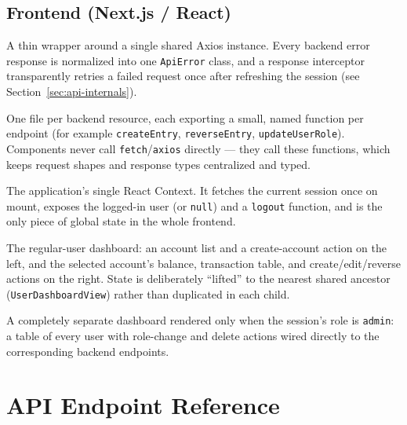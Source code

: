 \documentclass[11pt]{article}
\begin{document}
\subsection{Frontend (Next.js / React)}

\begin{description}[style=nextline]
    \item[\texttt{lib/api-client.ts}] A thin wrapper around a single
    shared Axios instance. Every backend error response is normalized
    into one \texttt{ApiError} class, and a response interceptor
    transparently retries a failed request once after refreshing the
    session (see Section~\ref{sec:api-internals}).

    \item[\texttt{lib/api/*.ts}] One file per backend resource, each
    exporting a small, named function per endpoint (for example
    \texttt{createEntry}, \texttt{reverseEntry}, \texttt{updateUserRole}).
    Components never call \texttt{fetch}/\texttt{axios} directly ---
    they call these functions, which keeps request shapes and response
    types centralized and typed.

    \item[\texttt{contexts/user-context.tsx}] The application's single
    React Context. It fetches the current session once on mount, exposes
    the logged-in user (or \texttt{null}) and a \texttt{logout} function,
    and is the only piece of global state in the whole frontend.

    \item[\texttt{components/dashboard/*}] The regular-user dashboard:
    an account list and a create-account action on the left, and the
    selected account's balance, transaction table, and
    create/edit/reverse actions on the right. State is deliberately
    ``lifted'' to the nearest shared ancestor
    (\texttt{UserDashboardView}) rather than duplicated in each child.

    \item[\texttt{components/admin/*}] A completely separate dashboard
    rendered only when the session's role is \texttt{admin}: a table of
    every user with role-change and delete actions wired directly to the
    corresponding backend endpoints.
\end{description}

\section{API Endpoint Reference}
\end{document}
